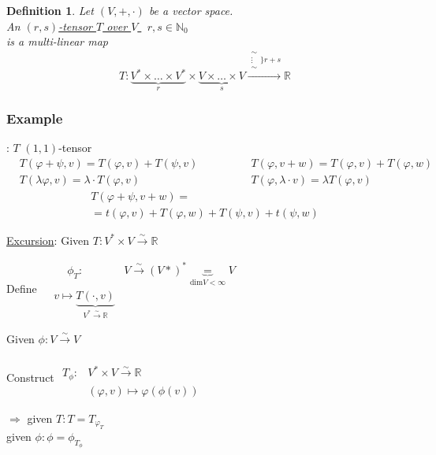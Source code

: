 \documentclass[10pt]{amsart}
\newtheorem{definition}{Definition}
\begin{document}
\begin{multicols*}{2}
\begin{definition}
	Let $(V,+,\cdot)$ be a vector space. \\
	An \underline{ $(r,s)$-tensor $T$ over $V$ } \qquad \, $r,s \in \mathbb{N}_0 $\\
	is a multi-linear map
	\[
	T: \underbrace{ V^* \times \dots \times V^* }_r \times \underbrace{ V \times \dots \times V}_s \xrightarrow{ \substack{ \sim \\ \vdots \\ \sim } \rbrace r + s } \mathbb{R}
	\]
\end{definition}

\subsubsection{Example}: $T$ $(1,1)$-tensor
\[
\begin{aligned}
& T(\varphi + \psi, v) = T(\varphi,v) + T(\psi,v) \\ 
& T(\lambda \varphi , v) = \lambda \cdot T(\varphi,v)
\end{aligned} \qquad \qquad \begin{gathered}
T(\varphi,v+w) = T(\varphi,v) + T(\varphi,w) \\ 
T(\varphi, \lambda \cdot v) = \lambda T(\varphi, v) 
\end{gathered}
\]
\[
\begin{gathered}
T(\varphi + \psi , v+ w)  = \\
= t(\varphi,v) + T(\varphi,w) + T(\psi,v) + t(\psi,w)
\end{gathered}
\]

\underline{Excursion}:
Given $T:V^* \times V \xrightarrow{ \sim } \mathbb{R}$

Define $\begin{aligned} & \quad \ 
\phi_T: & V\xrightarrow{ \sim } (V*)^* \underbrace{=}_{\text{dim}V < \infty} V \\
& v\mapsto \underbrace{ T(\cdot , v)  }_{V^* \xrightarrow{ \sim } \mathbb{R}} \end{aligned}$

Given $\phi : V \xrightarrow{ \sim } V$

Construct $\begin{aligned} & \quad \\ 
T_{\phi} : & V^* \times V \xrightarrow{ \sim } \mathbb{R} \\
& (\varphi,v) \mapsto \varphi(\phi(v)) \end{aligned}$

$\Longrightarrow $ given $T: T = T_{\varphi_T}$ \\
\phantom{$\Longrightarrow$} given $\phi: \phi = \phi_{T_{\phi}}$


\end{multicols*}
\end{document}
